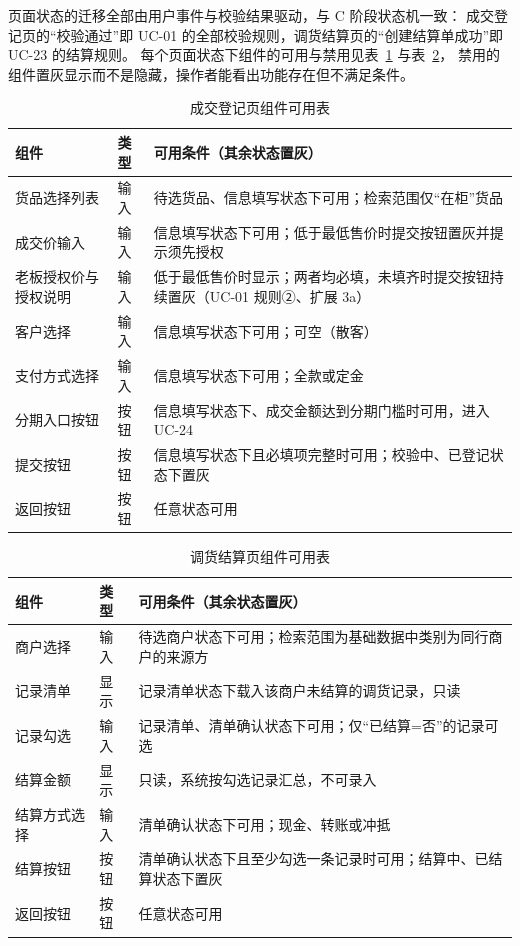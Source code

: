 \documentclass[12pt, a4paper]{ctexart}
\begin{document}
页面状态的迁移全部由用户事件与校验结果驱动，与 C 阶段状态机一致：
成交登记页的“校验通过”即 UC-01 的全部校验规则，调货结算页的“创建结算单成功”即 UC-23 的结算规则。
每个页面状态下组件的可用与禁用见表~\ref{tab:ui-deal} 与表~\ref{tab:ui-transfer}，
禁用的组件置灰显示而不是隐藏，操作者能看出功能存在但不满足条件。

\begin{table}[H]
\centering
\small
\caption{成交登记页组件可用表}
\label{tab:ui-deal}
\begin{tabularx}{\textwidth}{@{}l l X@{}}
\toprule
组件 & 类型 & 可用条件（其余状态置灰） \\
\midrule
货品选择列表 & 输入 & 待选货品、信息填写状态下可用；检索范围仅“在柜”货品 \\
成交价输入 & 输入 & 信息填写状态下可用；低于最低售价时提交按钮置灰并提示须先授权 \\
老板授权价与授权说明 & 输入 & 低于最低售价时显示；两者均必填，未填齐时提交按钮持续置灰（UC-01 规则②、扩展 3a） \\
客户选择 & 输入 & 信息填写状态下可用；可空（散客） \\
支付方式选择 & 输入 & 信息填写状态下可用；全款或定金 \\
分期入口按钮 & 按钮 & 信息填写状态下、成交金额达到分期门槛时可用，进入 UC-24 \\
提交按钮 & 按钮 & 信息填写状态下且必填项完整时可用；校验中、已登记状态下置灰 \\
返回按钮 & 按钮 & 任意状态可用 \\
\bottomrule
\end{tabularx}
\end{table}

\begin{table}[H]
\centering
\small
\caption{调货结算页组件可用表}
\label{tab:ui-transfer}
\begin{tabularx}{\textwidth}{@{}l l X@{}}
\toprule
组件 & 类型 & 可用条件（其余状态置灰） \\
\midrule
商户选择 & 输入 & 待选商户状态下可用；检索范围为基础数据中类别为同行商户的来源方 \\
记录清单 & 显示 & 记录清单状态下载入该商户未结算的调货记录，只读 \\
记录勾选 & 输入 & 记录清单、清单确认状态下可用；仅“已结算=否”的记录可选 \\
结算金额 & 显示 & 只读，系统按勾选记录汇总，不可录入 \\
结算方式选择 & 输入 & 清单确认状态下可用；现金、转账或冲抵 \\
结算按钮 & 按钮 & 清单确认状态下且至少勾选一条记录时可用；结算中、已结算状态下置灰 \\
返回按钮 & 按钮 & 任意状态可用 \\
\bottomrule
\end{tabularx}
\end{table}
\end{document}
